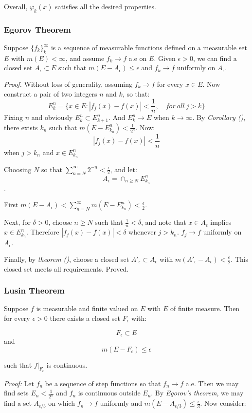 \documentclass[
]{article}
\begin{document}
Overall, \(\varphi_k(x)\) satisfies all the desired properties.

\subsubsection{Egorov Theorem}
Suppose \(\{f_k\}_k^{\infty}\) is a sequence of measurable functions defined on a
measurable set \(E\) with \(m(E)<\infty\), and assume \(f_k \to f \) a.e on \(E\).
Given \(\epsilon > 0\), we can find a closed set \(A_{\epsilon}\subset E\) such that
\(m(E-A_{\epsilon})\leq \epsilon\) and \(f_k\to f\) uniformly on \(A_{\epsilon}\).

\textit{Proof.} Without loss of generality, assuming \(f_k\to f\) for every \(x\in E\).
Now construct a pair of two integers \(n\) and \(k\), so that:
\[E_k^n = \{x\in E: |f_j(x)-f(x)|<\frac{1}{n},\quad for\ all\ j>k\}\]
Fixing \(n\) and obviously \(E_k^n\subset E_{k+1}^n\). And \(E_k^n \to E\) when \(k\to \infty\).
By \textit{Corollary ()}, there exists \(k_n\) such that \(m(E-E_{k_n}^n)<\frac{1}{2^n}\).
Now:
\[|f_j(x)-f(x)|<\frac{1}{n}\]
when \(j>k_n\) and \(x\in E_{k_n}^n\)

Choosing \(N\) so that \(\sum_{n=N}^{\infty}2^{-n}<\frac{\epsilon}{2}\), and let:
\[A_{\epsilon}=\cap_{n\geq N}E_{k_n}^n\].

First \(m(E-A_{\epsilon})<\sum_{n=N}^{\infty}m(E-E_{k_n}^n)<\frac{\epsilon}{2}\).

Next, for \(\delta>0\), choose \(n\geq N\) such that \(\frac{1}{n}<\delta\), and note that \(x\in A_{\epsilon}\)
implies \(x\in E_{k_n}^n\). Therefore \(|f_j(x)-f(x)| < \delta\) whenever \(j > k_n\). \(f_j\to f\) uniformly on
\(A_{\epsilon}\).

Finally, by \textit{theorem ()}, choose a closed set \(A'_{\epsilon}\subset A_{\epsilon}\) with
\(m(A'_{\epsilon}-A_{\epsilon})<\frac{\epsilon}{2}\). This closed set meets all requirements. Proved.

\subsubsection{Lusin Theorem}
Suppose \(f\) is measurable and finite valued on \(E\) with \(E\) of finite measure. Then for
every \(\epsilon > 0\) there exists a closed set \(F_{\epsilon}\) with:

\[F_{\epsilon} \subset E\] and
\[m(E-F_{\epsilon})\leq \epsilon\]

such that \(f|_{F_{\epsilon}}\) is continuous.

\textit{Proof:} Let \(f_n\) be a sequence of step functions so that \(f_n\to f\) a.e. Then we may
find sets \(E_n < \frac{1}{2^n}\) and \(f_n\) is continuous outside \(E_n\). By \textit{Egorov's theorem},
we may find a set \(A_{\epsilon/3}\) on which \(f_n\to f\) uniformly and \(m(E-A_{\epsilon/3})\leq \frac{\epsilon}{3}\).
Now consider:
\end{document}
